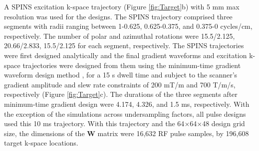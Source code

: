 \par A SPINS excitation k-space trajectory \cite{malik2012tailored} (Figure \ref{fig:Target}b) with 5 mm max resolution was used for the designs. 
The SPINS trajectory comprised three segments with radii ranging between 1-0.625, 0.625-0.375, and 0.375-0 cycles/cm, respectively.
The number of polar and azimuthal rotations were 15.5/2.125, 20.66/2.833, 15.5/2.125 for each segment, respectively.
The SPINS trajectories were first designed analytically and the final gradient waveforms and excitation k-space trajectories were designed from them 
using the minimum-time gradient waveform design method \cite{lustig2008fast}, 
for a 15 {\textmu}s dwell time and subject to the scanner's gradient amplitude and slew rate constraints of 200 mT/m and 700 T/m/s, respectively (Figure \ref{fig:Target}c). 
The durations of the three segments after minimum-time gradient design were 4.174, 4.326, and 1.5 ms, respectively.
With the exception of the simulations across undersampling factors, 
all pulse designs used this 10 ms trajectory.
With this trajectory and the 64$\times$64$\times$48 design grid size, 
the dimensions of the $\bm{W}$ matrix were 16,632 RF pulse samples, 
by 196,608 target k-space locations. 



